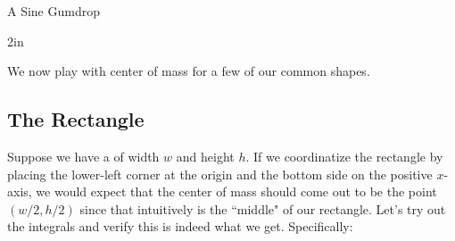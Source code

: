 \begin{exercise}{A Sine Gumdrop \Coffeecup \Coffeecup}
\begin{itemize}
{}{2in}
\end{itemize}

\end{exercise}

We now play with center of mass for a few of our common shapes.

\subsection{The Rectangle}

Suppose we have a  of width $w$ and height $h$.  If we coordinatize the rectangle by placing the lower-left corner at the origin and the bottom side on the positive $x$-axis, we would expect that the center of mass should come out to be the point $(w/2,h/2)$ since that intuitively is the ``middle" of our rectangle.  Let's try out the integrals and verify this is indeed what we get.  Specifically:


